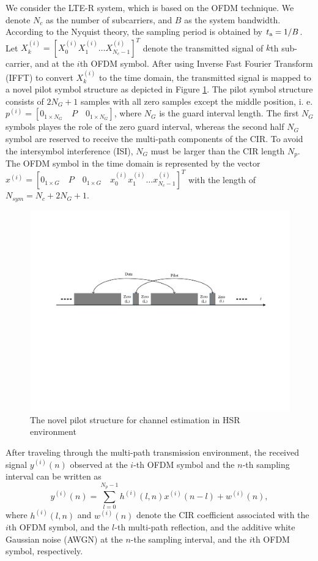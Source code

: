 \documentclass[AMA]{WileyNJD-v1}
\begin{document}
We consider the LTE-R system, which is based on the OFDM technique. We denote $N_{c}$ as the number of subcarriers, and $B$ as the system bandwidth. According to the Nyquist theory, the sampling period is obtained by $t_{\rm a}=1/B$. Let $X^{(i)}_{k}= [X^{(i)}_{0} X^{(i)}_{1} \dots  X^{(i)}_{N_c-1}]^{T}$ denote the transmitted signal of $k$th sub-carrier, and at the $i$th OFDM symbol. After using Inverse Fast Fourier Transform (IFFT) to convert $X^{(i)}_{k}$ to the time domain, the transmitted signal is mapped to a novel pilot symbol structure as depicted in Figure \ref{fig:pilot-pattern}. The pilot symbol structure consists of  $2N_G+1$ samples with all zero samples except the middle position, i. e. $p^{(i)}=[0_{1\times N_G}\quad P\quad  0_{1\times N_G}]$, where $N_G$ is the guard interval length. The first  $N_G$ symbols playes the role of the zero guard interval, whereas the second half $N_G$ symbol are reserved to receive the multi-path components of the CIR. To avoid the intersymbol interference (ISI), $N_G$ must be larger than the CIR length $N_p$. The OFDM symbol in the time domain is represented by the  vector $x^{(i)}=[0_{1\times G}\quad P\quad  0_{1\times G}\quad  x^{(i)}_{0} x^{(i)}_{1} \dots x^{(i)}_{N_c-1}]^{T}$ with the length of $ N_{sym}=N_c+2N_G+1$.
%
\begin{figure}[t]
		\centering
		\includegraphics[width=0.9\linewidth]{"figures/pilot pattern"}
		\caption{The novel pilot structure for channel estimation in HSR environment }
		\label{fig:pilot-pattern}
\end{figure}
%	
	
After traveling through the multi-path transmission environment, the received signal $ y^{(i)}(n)$ observed at the $i$-th OFDM symbol and the $n$-th sampling interval can be written as
%
\begin{equation}\label{eq-time received signal} 
	y^{(i)}(n)= \sum_{l=0}^{{N_p}-1}h^{(i)}(l,n) x^{(i)}(n-l) + w^{(i)}(n),
\end{equation}
%
where $h^{(i)}(l,n)$  and  $w^{(i)}(n)$ denote the CIR coefficient associated with the $i$th OFDM symbol, and the $l$-th multi-path reflection, and  the additive white Gaussian noise (AWGN) at the  $n$-the sampling interval, and the $i$th OFDM symbol, respectively.
	
\end{document}
